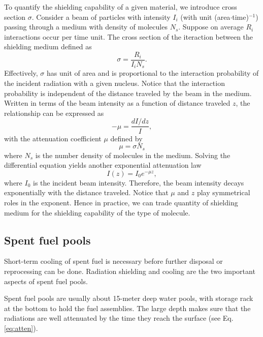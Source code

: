 \documentclass[nofootinbib,preprint,aps]{revtex4-1}
\begin{document}
    To quantify the shielding capability of a given material, we introduce cross section $\sigma$. Consider
    a beam of particles with intensity $I_i$ (with unit (area$\cdot$time)${}^{-1}$) passing through a medium
    with density of molecules $N_s$. Suppose on average $R_i$ interactions occur per time unit.
    The cross section of the iteraction between the shielding medium defined as
    \begin{equation}
        \sigma = \frac{R_i}{I_i N_s}.
    \end{equation}
    Effectively, $\sigma$ has unit of area and
    is proportional to the interaction probability of the incident radiation with a given nucleus.\cite{k88}
    Notice that the interaction probability is independent of the distance traveled by the beam in
    the medium. Written in terms of the beam intensity as a function of distance traveled $z$,
    the relationship can be expressed as
    \begin{equation}
        -\mu = \frac{d I/dz}{I},
    \end{equation}
    with the attenuation coefficient $\mu$ defined by
    \begin{equation}
        \mu = \sigma N_s
    \end{equation}
    where $N_s$ is the number density of molecules in the medium.
    Solving the differential
    equation yields another exponential attenuation law
    \begin{equation}
        \label{eq:atten}
        I(z) = I_0 e^{-\mu z},
    \end{equation}
    where $I_0$ is the incident beam intensity. Therefore, the beam intensity decays exponentially
    with the distance traveled. Notice that $\mu$ and $z$ play symmetrical roles in the exponent. Hence
    in practice, we can trade quantity of shielding medium for the shielding capability of the type of
    molecule.

    \subsection{Spent fuel pools}
    Short-term cooling of spent fuel is necessary before further disposal or reprocessing can be done.
    Radiation shielding and cooling are the two important aspects of spent fuel pools.

    Spent fuel pools  are usually about 15-meter deep water pools,
    with storage rack at the bottom to hold the fuel assemblies. The large depth makes sure that the radiations
    are well attenuated by the time they reach the surface (see Eq.\ref{eq:atten}).
\end{document}
